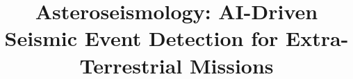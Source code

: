 \documentclass[conference]{IEEEtran}
\begin{document}
\title{Asteroseismology: AI-Driven Seismic Event Detection for Extra-Terrestrial Missions\\
}


\maketitle
\end{document}
